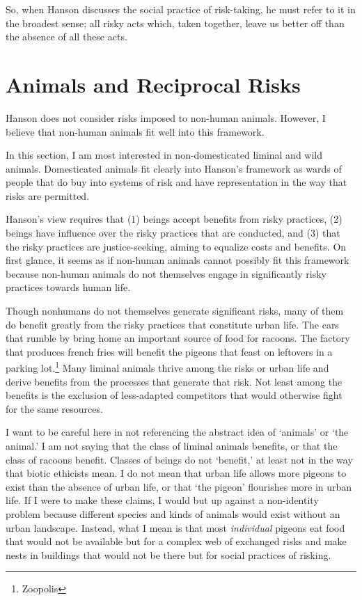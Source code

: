 So, when Hanson discusses the social practice of risk-taking, he must refer to
it in the broadest sense; all risky acts which, taken together, leave us better
off than the absence of all these acts.


\section{Animals and Reciprocal Risks}

Hanson does not consider risks imposed to non-human animals. However, I believe
that non-human animals fit well into this framework.

In this section, I am most interested in non-domesticated liminal and wild
animals. Domesticated animals fit clearly into Hanson’s framework as wards of
people that do buy into systems of risk and have representation in the way that
risks are permitted.

Hanson’s view requires that (1) beings accept benefits from risky practices,
(2) beings have influence over the risky practices that are conducted, and (3)
that the risky practices are justice-seeking, aiming to equalize costs and
benefits.  On first glance, it seems as if non-human animals cannot possibly
fit this framework because non-human animals do not themselves engage in
significantly risky practices towards human life.

Though nonhumans do not themselves generate significant risks, many of them do
benefit greatly from the risky practices that constitute urban life. The cars
that rumble by bring home an important source of food for racoons. The factory
that produces french fries will benefit the pigeons that feast on leftovers in
a parking lot.\footnote{Zoopolis} Many liminal animals thrive among the risks
or urban life and derive benefits from the processes that generate that risk.
Not least among the benefits is the exclusion of less-adapted competitors that
would otherwise fight for the same resources.

I want to be careful here in not referencing the abstract idea of ‘animals’ or
‘the animal.’ I am not saying that the class of liminal animals benefits, or
that the class of racoons benefit. Classes of beings do not ‘benefit,’ at least
not in the way that biotic ethicists mean. I do not mean that urban life allows
more pigeons to exist than the absence of urban life, or that ‘the pigeon’
flourishes more in urban life. If I were to make these claims, I would but up
against a non-identity problem because different species and kinds of animals
would exist without an urban landscape. Instead, what I mean is that most
\emph{individual} pigeons eat food that would not be available but for a complex
web of exchanged risks and make nests in buildings that would not be there but
for social practices of risking.


